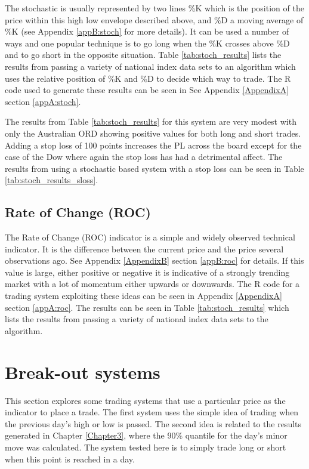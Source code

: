The stochastic is usually represented by two lines \%K which is the position of the price within this high low envelope described above, and \%D a moving average of \%K (see Appendix \ref{appB:stoch} for more details). It can be used a number of ways and one popular technique is to go long when the \%K crosses above \%D and to go short in the opposite situation. Table \ref{tab:stoch_results} lists the results from passing a variety of national index data sets to an algorithm which uses the relative position of \%K and \%D to decide which way to trade. The R code used to generate these results can be seen in See Appendix \ref{AppendixA} section \ref{appA:stoch}.



The results from Table \ref{tab:stoch_results} for this system are very modest with only the Australian ORD showing positive values for both long and short trades. Adding a stop loss of 100 points increases the PL across the board except for the case of the Dow where again the stop loss has had a detrimental affect. The results from using a stochastic based system with a stop loss can be seen in Table \ref{tab:stoch_results_sloss}.


 
\subsection{Rate of Change (ROC)}
The Rate of Change (ROC) indicator is a simple and widely observed technical indicator. It is the difference between the current price and the price several observations ago. See Appendix \ref{AppendixB} section \ref{appB:roc} for details. If this value is large, either positive or negative it is indicative of a strongly trending market with a lot of momentum either upwards or downwards. The R code for a trading system exploiting these ideas can be seen in Appendix \ref{AppendixA} section \ref{appA:roc}. The results can be seen in Table \ref{tab:stoch_results} which lists the results from passing a variety of national index data sets to the algorithm.



%

\section{Break-out systems}
\label{sec:bout}
This section explores some trading systems that use a particular price as the indicator to place a trade. The first system uses the simple idea of trading when the previous day's high or low is passed. The second idea is related to the results generated in Chapter \ref{Chapter3}, where the 90\% quantile for the day's minor move was calculated. The system tested here is to simply trade long or short when this point is reached in a day.

